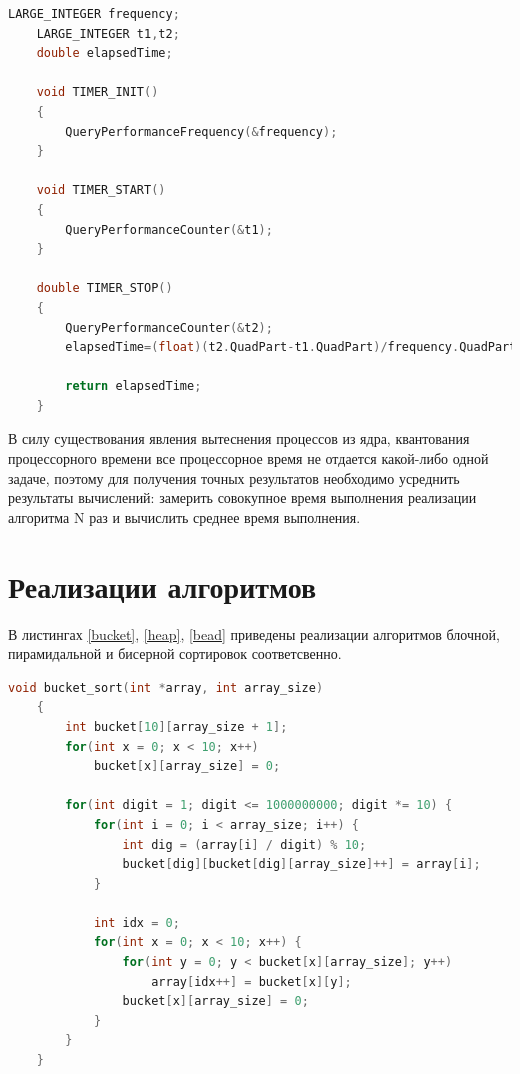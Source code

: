 \documentclass[a4paper,14pt, unknownkeysallowed]{extreport}
\begin{document}
\clearpage
        
\begin{lstlisting}[label= time,caption=Функции замеров процессорного времени,language=C]
    LARGE_INTEGER frequency;
    LARGE_INTEGER t1,t2;
    double elapsedTime;

    void TIMER_INIT()
    {
        QueryPerformanceFrequency(&frequency);
    }
    
    void TIMER_START()
    {
    	QueryPerformanceCounter(&t1);
    }
    
    double TIMER_STOP()
    {
        QueryPerformanceCounter(&t2); 
        elapsedTime=(float)(t2.QuadPart-t1.QuadPart)/frequency.QuadPart/COUNT*MICRO;
    	
    	return elapsedTime;
    }

\end{lstlisting}
		
В силу существования явления вытеснения процессов из ядра, квантования процессорного времени все процессорное время не отдается какой-либо одной задаче, поэтому для получения точных результатов необходимо усреднить результаты вычислений: замерить совокупное время выполнения реализации алгоритма N раз и вычислить среднее время выполнения.
		
\section{Реализации алгоритмов}
	
В листингах \ref{bucket}, \ref{heap}, \ref{bead} приведены реализации алгоритмов блочной, пирамидальной и бисерной сортировок соответсвенно.

\clearpage

\begin{lstlisting}[label=bucket,caption=Алгоритм блочной сортировки,language=C]
    void bucket_sort(int *array, int array_size) 
    {
        int bucket[10][array_size + 1];
        for(int x = 0; x < 10; x++)
            bucket[x][array_size] = 0;
    
        for(int digit = 1; digit <= 1000000000; digit *= 10) {
            for(int i = 0; i < array_size; i++) {
                int dig = (array[i] / digit) % 10;
                bucket[dig][bucket[dig][array_size]++] = array[i];
            }
    
            int idx = 0;
            for(int x = 0; x < 10; x++) {
                for(int y = 0; y < bucket[x][array_size]; y++)
                    array[idx++] = bucket[x][y];
                bucket[x][array_size] = 0;
            }
        }
    }
\end{lstlisting}
\end{document}
